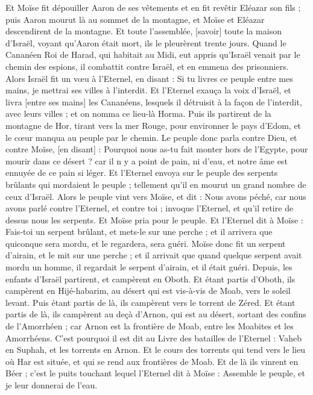 \begin{multicols}{2}
Et Moïse fit dépouiller Aaron de ses vêtements et en fit revêtir Eléazar son fils ; puis Aaron mourut là au sommet de la montagne, et Moïse et Eléazar descendirent de la montagne.
Et toute l'assemblée, [savoir] toute la maison d'Israël, voyant qu'Aaron était mort, ils le pleurèrent trente jours.
\VerseOne{}Quand le Cananéen Roi de Harad, qui habitait au Midi, eut appris qu'Israël venait par le chemin des espions, il combattit contre Israël, et en emmena des prisonniers.
Alors Israël fit un vœu à l'Eternel, en disant : Si tu livres ce peuple entre mes mains, je mettrai ses villes à l'interdit.
Et l'Eternel exauça la voix d'Israël, et livra [entre ses mains] les Cananéens, lesquels il détruisit à la façon de l'interdit, avec leurs villes ; et on nomma ce lieu-là Horma.
Puis ils partirent de la montagne de Hor, tirant vers la mer Rouge, pour environner le pays d'Edom, et le cœur manqua au peuple par le chemin.
Le peuple donc parla contre Dieu, et contre Moïse, [en disant] : Pourquoi nous as-tu fait monter hors de l'Egypte, pour mourir dans ce désert ? car il n y a point de pain, ni d'eau, et notre âme est ennuyée de ce pain si léger.
Et l'Eternel envoya sur le peuple des serpents brûlants qui mordaient le peuple ; tellement qu'il en mourut un grand nombre de ceux d'Israël.
Alors le peuple vint vers Moïse, et dit : Nous avons péché, car nous avons parlé contre l'Eternel, et contre toi ; invoque l'Eternel, et qu'il retire de dessus nous les serpents. Et Moïse pria pour le peuple.
Et l'Eternel dit à Moïse : Fais-toi un serpent brûlant, et mets-le sur une perche ; et il arrivera que quiconque sera mordu, et le regardera, sera guéri.
Moïse donc fit un serpent d'airain, et le mit sur une perche ; et il arrivait que quand quelque serpent avait mordu un homme, il regardait le serpent d'airain, et il était guéri.
Depuis, les enfants d'Israël partirent, et campèrent en Oboth.
Et étant partis d'Oboth, ils campèrent en Hijé-habarim, au désert qui est vis-à-vis de Moab, vers le soleil levant.
Puis étant partis de là, ils campèrent vers le torrent de Zéred.
Et étant partis de là, ils campèrent au deçà d'Arnon, qui est au désert, sortant des confins de l'Amorrhéen ; car Arnon est la frontière de Moab, entre les Moabites et les Amorrhéens.
C'est pourquoi il est dit au Livre des batailles de l'Eternel : Vaheb en Suphah, et les torrents en Arnon.
Et le cours des torrents qui tend vers le lieu où Har est située, et qui se rend aux frontières de Moab.
Et de là ils vinrent en Béer ; c'est le puits touchant lequel l'Eternel dit à Moïse : Assemble le peuple, et je leur donnerai de l'eau.

\end{multicols}
